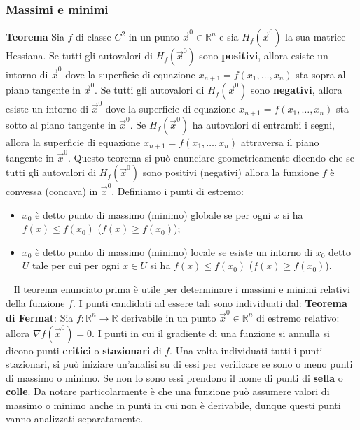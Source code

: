 \subsubsection{Massimi e minimi}
\textbf{Teorema} Sia $f$ di classe $C^2$ in un punto $\vec{x}^0 \in \mathbb{R}^n$ e sia $H_f (\vec{x}^0)$ la sua matrice Hessiana. Se tutti gli autovalori di $H_f(\vec{x}^0)$ sono \textbf{positivi}, allora esiste un intorno di $\vec{x}^0$ dove la superficie di equazione $x_{n+1} = f(x_1,\dots,x_n)$ sta sopra al piano tangente in $\vec{x}^0$. Se tutti gli autovalori di $H_f(\vec{x}^0)$ sono \textbf{negativi}, allora esiste un intorno di $\vec{x}^0$ dove la superficie di equazione $x_{n+1} = f(x_1,\dots,x_n)$ sta sotto al piano tangente in $\vec{x}^0$. Se $H_f(\vec{x}^0)$ ha autovalori di entrambi i segni, allora la superficie di equazione $x_{n+1} = f(x_1,\dots,x_n)$ attraversa il piano tangente in $\vec{x}^0$.\newline
\newline
Questo teorema si può enunciare geometricamente dicendo che se tutti gli autovalori di $H_f(\vec{x}^0)$  sono positivi (negativi) allora la funzione $f$ è convessa (concava) in $\vec{x}^0$.\newline
\newline
Definiamo i punti di estremo:
\begin{itemize}
    \item $x_0$ è detto punto di massimo (minimo) globale se per ogni $x$ si ha $f(x) \leq f(x_0)$ ($f(x) \geq f(x_0)$);
    \item $x_0$ è detto punto di massimo (minimo) locale se esiste un intorno di $x_0$ detto $U$ tale per cui per ogni $x \in U$ si ha $f(x) \leq f(x_0)$ ($f(x) \geq f(x_0)$).
\end{itemize}
\ \newline
Il teorema enunciato prima è utile per determinare i massimi e minimi relativi della funzione $f$. I punti candidati ad essere tali sono individuati dal:\newline
\textbf{Teorema di Fermat}: Sia $f: \mathbb{R}^n \rightarrow  \mathbb{R}$ derivabile in un punto $\vec{x}^0 \in \mathbb{R}^n$ di estremo relativo: allora $\nabla f (\vec{x}^0) = 0$.
\newline
\newline
I punti in cui il gradiente di una funzione si annulla si dicono punti \textbf{critici} o \textbf{stazionari} di $f$. Una volta individuati tutti i punti stazionari, si può iniziare un'analisi su di essi per verificare se sono o meno punti di massimo o minimo. Se non lo sono essi prendono il nome di punti di \textbf{sella} o \textbf{colle}. Da notare particolarmente è che una funzione può assumere valori di massimo o minimo anche in punti in cui non è derivabile, dunque questi punti vanno analizzati separatamente.\newline
